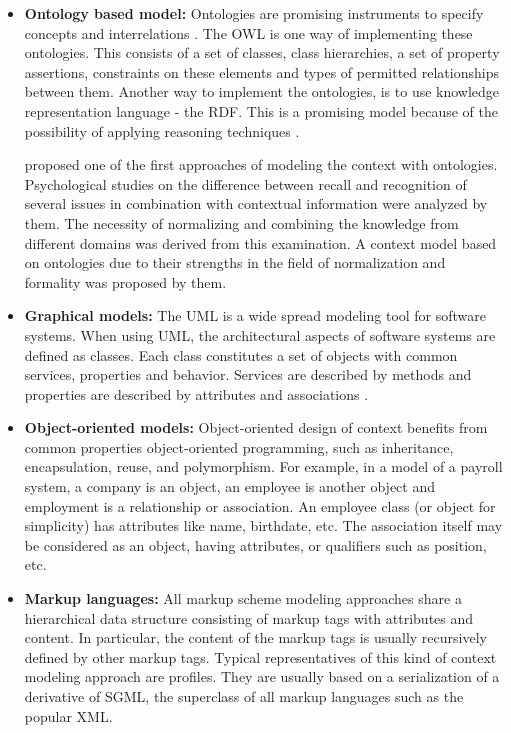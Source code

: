 \begin{itemize}
\item \textbf{Ontology based model: }
Ontologies are promising instruments to specify concepts and interrelations \cite{gruber_1993}. The \ac{OWL} is one way of implementing these ontologies. This consists of a set of classes, class hierarchies, a set of property assertions, constraints on these elements and types of permitted relationships between them. Another way to implement the ontologies, is to use knowledge representation language - the \ac{RDF}. This is a promising model because of the possibility of applying reasoning techniques \cite{Riva04}.  

\citeauthor{Oeztuerk97towardsa} proposed one of the first approaches of modeling the context with ontologies. Psychological studies on the difference between recall and recognition of several issues in combination with contextual information were analyzed by them. The necessity of normalizing and combining the knowledge from different domains was derived from this examination. A context model based on ontologies due to their strengths in the field of normalization and formality was proposed by them.

\item \textbf{Graphical models:} 
The \ac{UML} is a wide spread modeling tool for software systems. When using \ac{UML}, the architectural aspects of software systems are defined as classes. Each class constitutes a set of objects with common services, properties and behavior. Services are described by methods and properties are described by attributes and associations \cite{Sheng2005}.

\item \textbf{Object-oriented models:} Object-oriented design of context benefits from common properties object-oriented programming, such as inheritance, encapsulation, reuse, and polymorphism. For example, in a model of a payroll system, a company is an object, an employee is another object and employment is a relationship or association. An employee class (or object for simplicity) has attributes like name, birthdate, etc. The association itself may be considered as an object, having attributes, or qualifiers such as position, etc\cite{pSkills:Object-oriented_modeling}.

\item \textbf{Markup languages: } All markup scheme modeling approaches share a hierarchical data structure consisting of markup tags with attributes and content. In particular, the content of the markup tags is usually recursively defined by other markup tags. Typical representatives of this kind of context modeling approach are profiles. They are usually based on a serialization of a derivative of \ac{SGML}, the superclass of all markup languages such as the popular \ac{XML}\cite{Strang2004}.

\end{itemize}

